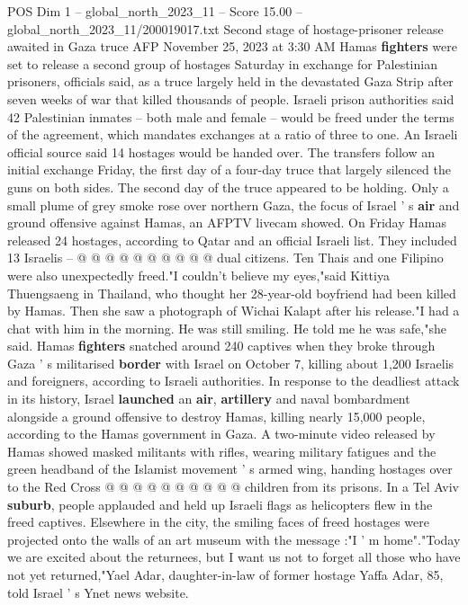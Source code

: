 \begin{textsample}{POS Dim 1 – global\_north\_2023\_11 – Score 15.00 – global\_north\_2023\_11/200019017.txt}  \label{ex:f1_pos_356}
Second stage of hostage-prisoner release awaited in Gaza truce AFP November 25, 2023 at 3:30 AM Hamas \textbf{fighters} were set to release a second group of hostages Saturday in exchange for Palestinian prisoners, officials said, as a truce largely held in the devastated Gaza Strip after seven weeks of war that killed thousands of people.
Israeli prison authorities said 42 Palestinian inmates -- both male and female -- would be freed under the terms of the agreement, which mandates exchanges at a ratio of three to one.
An Israeli official source said 14 hostages would be handed over.
The transfers follow an initial exchange Friday, the first day of a four-day truce that largely silenced the guns on both sides.
The second day of the truce appeared to be holding.
Only a small plume of grey smoke rose over northern Gaza, the focus of Israel ' s \textbf{air} and ground offensive against Hamas, an AFPTV livecam showed.
On Friday Hamas released 24 hostages, according to Qatar and an official Israeli list.
They included 13 Israelis -- @ @ @ @ @ @ @ @ @ @ dual citizens.
Ten Thais and one Filipino were also unexpectedly freed."I couldn't believe my eyes,"said Kittiya Thuengsaeng in Thailand, who thought her 28-year-old boyfriend had been killed by Hamas.
Then she saw a photograph of Wichai Kalapt after his release."I had a chat with him in the morning.
He was still smiling.
He told me he was safe,"she said.
Hamas \textbf{fighters} snatched around 240 captives when they broke through Gaza ' s militarised \textbf{border} with Israel on October 7, killing about 1,200 Israelis and foreigners, according to Israeli authorities.
In response to the deadliest attack in its history, Israel \textbf{launched} an \textbf{air}, \textbf{artillery} and naval bombardment alongside a ground offensive to destroy Hamas, killing nearly 15,000 people, according to the Hamas government in Gaza.
A two-minute video released by Hamas showed masked militants with rifles, wearing military fatigues and the green headband of the Islamist movement ' s armed wing, handing hostages over to the Red Cross @ @ @ @ @ @ @ @ @ @ children from its prisons.
In a Tel Aviv \textbf{suburb}, people applauded and held up Israeli flags as helicopters flew in the freed captives.
Elsewhere in the city, the smiling faces of freed hostages were projected onto the walls of an art museum with the message :"I ' m home"."Today we are excited about the returnees, but I want us not to forget all those who have not yet returned,"Yael Adar, daughter-in-law of former hostage Yaffa Adar, 85, told Israel ' s Ynet news website.

\end{textsample}

